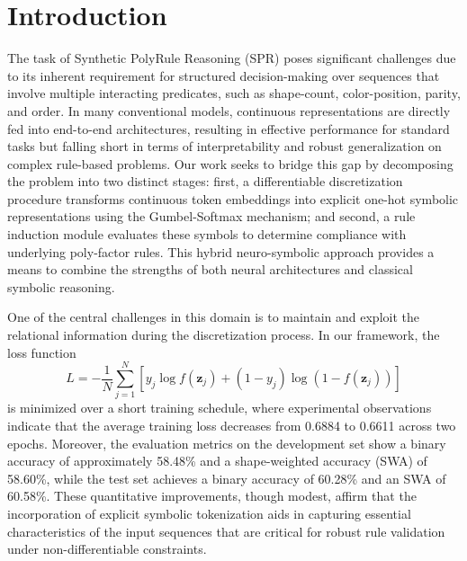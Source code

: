 \documentclass[11pt]{article}
\begin{document}
\section{Introduction}
The task of Synthetic PolyRule Reasoning (SPR) poses significant challenges due to its inherent requirement for structured decision-making over sequences that involve multiple interacting predicates, such as shape-count, color-position, parity, and order. In many conventional models, continuous representations are directly fed into end-to-end architectures, resulting in effective performance for standard tasks but falling short in terms of interpretability and robust generalization on complex rule-based problems. Our work seeks to bridge this gap by decomposing the problem into two distinct stages: first, a differentiable discretization procedure transforms continuous token embeddings into explicit one-hot symbolic representations using the Gumbel-Softmax mechanism; and second, a rule induction module evaluates these symbols to determine compliance with underlying poly-factor rules. This hybrid neuro-symbolic approach provides a means to combine the strengths of both neural architectures and classical symbolic reasoning.

One of the central challenges in this domain is to maintain and exploit the relational information during the discretization process. In our framework, the loss function 
\[
L = -\frac{1}{N} \sum_{j=1}^{N} \left[ y_j \log f(\mathbf{z}_j) + (1 - y_j) \log (1 - f(\mathbf{z}_j)) \right]
\]
is minimized over a short training schedule, where experimental observations indicate that the average training loss decreases from 0.6884 to 0.6611 across two epochs. Moreover, the evaluation metrics on the development set show a binary accuracy of approximately 58.48\% and a shape-weighted accuracy (SWA) of 58.60\%, while the test set achieves a binary accuracy of 60.28\% and an SWA of 60.58\%. These quantitative improvements, though modest, affirm that the incorporation of explicit symbolic tokenization aids in capturing essential characteristics of the input sequences that are critical for robust rule validation under non-differentiable constraints.
\end{document}
